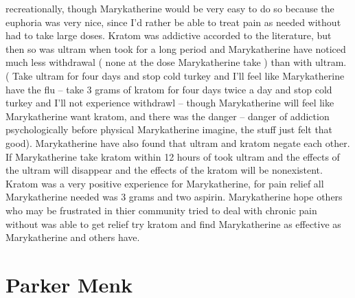 \documentclass[12pt]{book}
\begin{document}
recreationally, though Marykatherine would be very easy to do so because the euphoria was very nice, since I'd rather be able to treat pain as needed without had to take large doses. Kratom was addictive accorded to the literature, but then so was ultram when took for a long period and Marykatherine have noticed much less withdrawal ( none at the dose Marykatherine take ) than with ultram. ( Take ultram for four days and stop cold turkey and I'll feel like Marykatherine have the flu -- take 3 grams of kratom for four days twice a day and stop cold turkey and I'll not experience withdrawl -- though Marykatherine will feel like Marykatherine want kratom, and there was the danger -- danger of addiction psychologically before physical Marykatherine imagine, the stuff just felt that good). Marykatherine have also found that ultram and kratom negate each other. If Marykatherine take kratom within 12 hours of took ultram and the effects of the ultram will disappear and the effects of the kratom will be nonexistent. Kratom was a very positive experience for Marykatherine, for pain relief all Marykatherine needed was 3 grams and two aspirin. Marykatherine hope others who may be frustrated in thier community tried to deal with chronic pain without was able to get relief try kratom and find Marykatherine as effective as Marykatherine and others have.






\chapter{Parker Menk}
\end{document}
